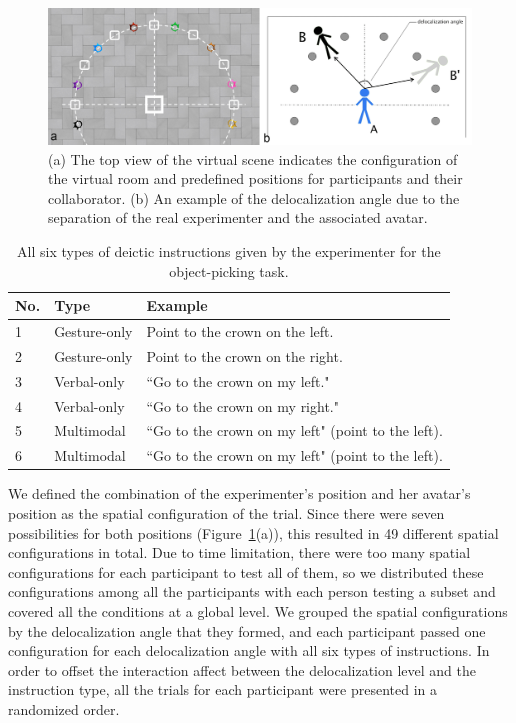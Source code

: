 \begin{figure}[tb]
  \centering
  \includegraphics[width=\textwidth]{figures/2_floor}
  \caption{\label{fig:2_floor}(a) The top view of the virtual scene indicates the configuration of the virtual room and predefined positions for participants and their collaborator. (b) An example of the delocalization angle due to the separation of the real experimenter and the associated avatar.}
\end{figure}

\begin{table}[!t]
\renewcommand{\arraystretch}{1.3}
\caption{All six types of deictic instructions given by the experimenter for the object-picking task.}
\label{tab:instruction_type}
\centering
\begin{tabular}{l l l}
	\hline
	No. & Type & Example \\
	\hline
    1 & Gesture-only & Point to the crown on the left. \\
    2 & Gesture-only & Point to the crown on the right. \\
    3 & Verbal-only & ``Go to the crown on my left." \\
    4 & Verbal-only & ``Go to the crown on my right." \\
    5 & Multimodal & ``Go to the crown on my left" (point to the left). \\
    6 & Multimodal & ``Go to the crown on my left" (point to the left). \\ \hline
\end{tabular}
\end{table}

We defined the combination of the experimenter's position and her avatar's position as the spatial configuration of the trial. Since there were seven possibilities for both positions (Figure~\ref{fig:2_floor}(a)), this resulted in 49 different spatial configurations in total. Due to time limitation, there were too many spatial configurations for each participant to test all of them, so we distributed these configurations among all the participants with each person testing a subset and covered all the conditions at a global level. We grouped the spatial configurations by the delocalization angle that they formed, and each participant passed one configuration for each delocalization angle with all six types of instructions. In order to offset the interaction affect between the delocalization level and the instruction type, all the trials for each participant were presented in a randomized order.

